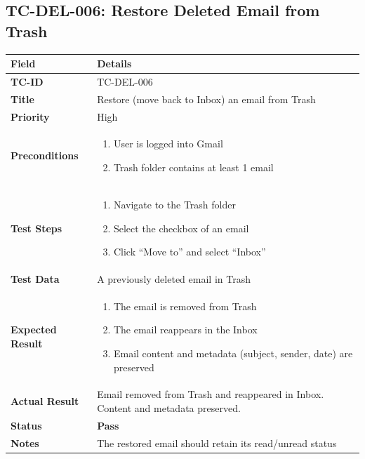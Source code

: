 \documentclass[12pt,a4paper]{article}
\begin{document}
\subsection{TC-DEL-006: Restore Deleted Email from Trash}

\begin{longtable}{|L{3.5cm}|L{11.5cm}|}
\hline
{}\textbf{Field} & \textbf{Details} \\
\hline
\textbf{TC-ID}           & TC-DEL-006 \\
\hline
\textbf{Title}           & Restore (move back to Inbox) an email from Trash \\
\hline
\textbf{Priority}        & High \\
\hline
\textbf{Preconditions}   & \begin{enumerate}[noitemsep,topsep=0pt]
                              \item User is logged into Gmail
                              \item Trash folder contains at least 1 email
                            \end{enumerate} \\
\hline
\textbf{Test Steps}      & \begin{enumerate}[noitemsep,topsep=0pt]
                              \item Navigate to the Trash folder
                              \item Select the checkbox of an email
                              \item Click ``Move to'' and select ``Inbox''
                            \end{enumerate} \\
\hline
\textbf{Test Data}       & A previously deleted email in Trash \\
\hline
\textbf{Expected Result} & \begin{enumerate}[noitemsep,topsep=0pt]
                              \item The email is removed from Trash
                              \item The email reappears in the Inbox
                              \item Email content and metadata (subject, sender, date) are preserved
                            \end{enumerate} \\
\hline
\textbf{Actual Result}   & Email removed from Trash and reappeared in Inbox. Content and metadata preserved. \\
\hline
\textbf{Status}          & \textcolor{passgreen}{\textbf{Pass}} \\
\hline
\textbf{Notes}           & The restored email should retain its read/unread status \\
\hline
\end{longtable}
\end{document}
